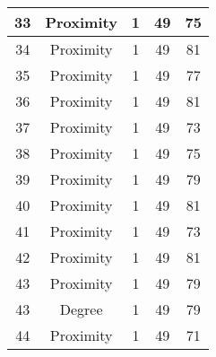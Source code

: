 \documentclass[results.tex]{subfiles}
\begin{document}
\begin{center}
\begin{tabular}{| c || c | c | c | c |}
            \hline
            33                      & Proximity                    & 1                      & 49                      & 75                   \\
            \hline
            34                      & Proximity                    & 1                      & 49                      & 81                   \\
            \hline
            35                      & Proximity                    & 1                      & 49                      & 77                   \\
            \hline
            36                      & Proximity                    & 1                      & 49                      & 81                   \\
            \hline
            37                      & Proximity                    & 1                      & 49                      & 73                   \\
            \hline
            38                      & Proximity                    & 1                      & 49                      & 75                   \\
            \hline
            39                      & Proximity                    & 1                      & 49                      & 79                   \\
            \hline
            40                      & Proximity                    & 1                      & 49                      & 81                   \\
            \hline
            41                      & Proximity                    & 1                      & 49                      & 73                   \\
            \hline
            42                      & Proximity                    & 1                      & 49                      & 81                   \\
            \hline
            43                      & Proximity                    & 1                      & 49                      & 79                   \\
            \hline
            43                      & Degree                       & 1                      & 49                      & 79                   \\
            \hline
            44                      & Proximity                    & 1                      & 49                      & 71                   \\

\end{tabular}
\end{center}
\end{document}
